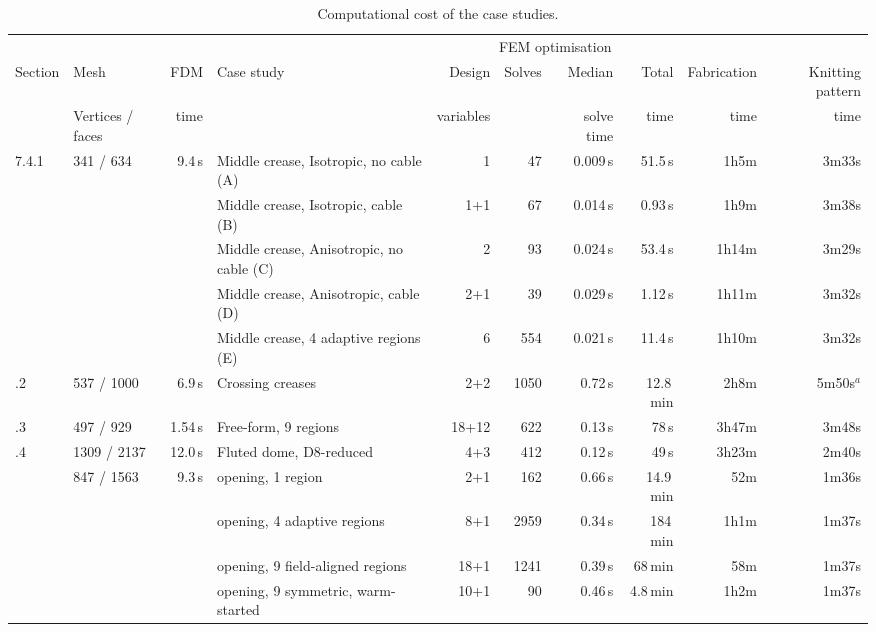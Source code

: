 \begin{landscape}
\begin{table}
\centering
\caption[Computational cost of the case studies]{Computational cost of the case studies.}\label{tab:computational-cost}
\footnotesize
\setlength{\tabcolsep}{8pt}
\begin{tabular}{@{}llrlrrrrrr@{}}
\toprule
 & & & & \multicolumn{4}{c}{FEM optimisation} & & \\
\cmidrule(lr){5-8}
Section & Mesh & FDM & Case study & Design & Solves & Median & Total & Fabrication & Knitting pattern \\
 & Vertices / faces & time & & variables & & solve time & time & time & time \\
\midrule

\multirow{5}{*}{7.4.1} & \multirow{5}{*}{341 / 634} & \multirow{5}{*}{9.4\,s}
 & Middle crease, Isotropic, no cable (A)     & 1     & 47   & 0.009\,s & 51.5\,s & 1h5m  & 3m33s \\
 & & & Middle crease, Isotropic, cable (B)      & 1+1   & 67   & 0.014\,s & 0.93\,s & 1h9m  & 3m38s \\
 & & & Middle crease, Anisotropic, no cable (C) & 2     & 93   & 0.024\,s & 53.4\,s & 1h14m & 3m29s \\
 & & & Middle crease, Anisotropic, cable (D)    & 2+1   & 39   & 0.029\,s & 1.12\,s & 1h11m & 3m32s \\
 & & & Middle crease, 4 adaptive regions (E)    & 6     & 554  & 0.021\,s & 11.4\,s & 1h10m & 3m32s \\
\addlinespace
7.4.2 & 537 / 1000 & 6.9\,s  & Crossing creases        & 2+2   & 1050 & 0.72\,s & 12.8\,min & 2h8m  & 5m50s$^{a}$ \\
\addlinespace
7.4.3 & 497 / 929  & 1.54\,s & Free-form, 9 regions    & 18+12 & 622  & 0.13\,s & 78\,s     & 3h47m & 3m48s \\
\addlinespace
7.4.4 & 1309 / 2137 & 12.0\,s & Fluted dome, D8-reduced & 4+3  & 412  & 0.12\,s & 49\,s     & 3h23m & 2m40s \\
\addlinespace
\multirow{4}{*}{7.4.5} & \multirow{4}{*}{847 / 1563} & \multirow{4}{*}{9.3\,s}
 & opening, 1 region                   & 2+1  & 162  & 0.66\,s & 14.9\,min & 52m  & 1m36s \\
 & & & opening, 4 adaptive regions      & 8+1  & 2959 & 0.34\,s & 184\,min  & 1h1m & 1m37s \\
 & & & opening, 9 field-aligned regions & 18+1 & 1241 & 0.39\,s & 68\,min   & 58m  & 1m37s \\
 & & & opening, 9 symmetric, warm-started & 10+1 & 90 & 0.46\,s & 4.8\,min  & 1h2m & 1m37s \\

\end{tabular}
\end{table}
\end{landscape}
